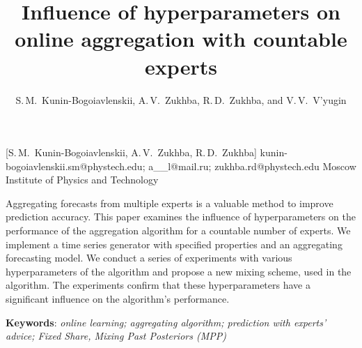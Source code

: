 \documentclass[12pt, twoside]{article}
\begin{document}
\English

\title
    [] %
    {Influence of hyperparameters on online aggregation with countable experts} %
\author
    [S.\,M.~Kunin-Bogoiavlenskii] %
    {S.\,M.~Kunin-Bogoiavlenskii, A.\,V.~Zukhba, R.\,D.~Zukhba, and V.\,V.~V’yugin} %
    [S.\,M.~Kunin-Bogoiavlenskii, A.\,V.~Zukhba, R.\,D.~Zukhba] %
\email
    {kunin-bogoiavlenskii.sm@phystech.edu; a\_\_l@mail.ru; zukhba.rd@phystech.edu}
\organization
    {Moscow Institute of Physics and Technology}
\abstract
    {

    Aggregating forecasts from multiple experts is a valuable method to improve prediction accuracy.
    This paper examines the influence of hyperparameters on the performance of the aggregation algorithm for a countable number of experts.
    We implement a time series generator with specified properties and an aggregating forecasting model. 
    We conduct a series of experiments with various hyperparameters of the algorithm and propose a new mixing scheme, used in the algorithm.
    The experiments confirm that these hyperparameters have a significant influence on the algorithm's performance.           
        
%   
%   
%   
%               
    \noindent
        \textbf{Keywords}: \emph{online learning; aggregating algorithm; prediction with experts’ advice; Fixed Share, Mixing Past Posteriors (MPP)}}

\end{document}
